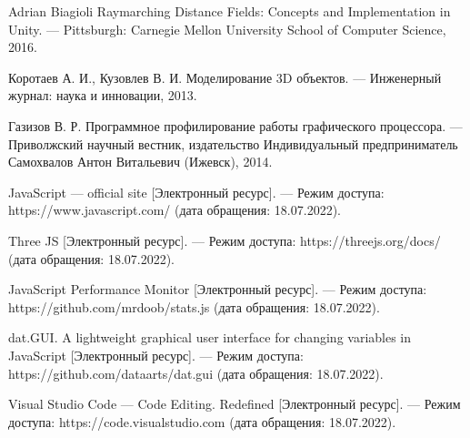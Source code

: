 \begin{thebibliography}{}
	Adrian Biagioli Raymarching Distance Fields: Concepts and Implementation in Unity. --- Pittsburgh: Carnegie Mellon University School of Computer Science, 2016.

	Коротаев А. И., Кузовлев В. И. Моделирование 3D объектов. --- Инженерный журнал: наука и инновации, 2013.
	
	Газизов В. Р. Программное профилирование работы графического процессора. --- Приволжский научный вестник, издательство Индивидуальный предприниматель Самохвалов Антон Витальевич (Ижевск), 2014.
	
	JavaScript --- official site [Электронный ресурс]. --- Режим доступа: https://www.javascript.com/ (дата обращения: 18.07.2022).
	
	Three JS [Электронный ресурс]. --- Режим доступа: https://threejs.org/docs/ (дата обращения: 18.07.2022).
	
	JavaScript Performance Monitor [Электронный ресурс]. --- Режим доступа: https://github.com/mrdoob/stats.js (дата обращения: 18.07.2022).
	
	dat.GUI. A lightweight graphical user interface for changing variables in JavaScript [Электронный ресурс]. --- Режим доступа: https://github.com/dataarts/dat.gui (дата обращения: 18.07.2022).
	
	Visual Studio Code --- Code Editing. Redefined [Электронный ресурс]. --- Режим доступа: https://code.visualstudio.com (дата обращения: 18.07.2022).
\end{thebibliography}
\endgroup

\pagebreak